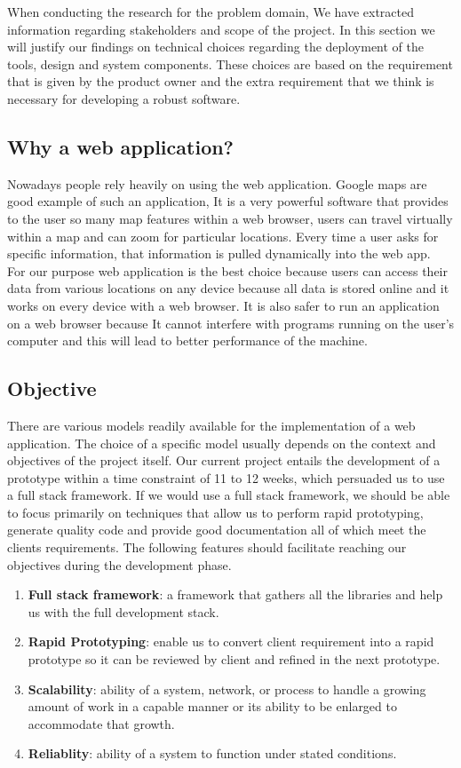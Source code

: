 When conducting the research for the problem domain, We have extracted information regarding stakeholders and scope of the project. In this section we will justify our findings on technical choices regarding the deployment of the tools, design and system components. These choices are based on the requirement that is given by the product owner and the extra requirement that we think is necessary for developing a robust software.

\subsection{Why a web application?}
Nowadays people rely heavily on using the web application. Google maps are good example of such an application, It is a very powerful software that provides to the user so many map features within a web browser, users can travel virtually within a map and can zoom for particular locations. Every time a user asks for specific information, that information is pulled dynamically into the web app.\\
 For our purpose web application is the best choice because users can access their data from various locations on any device because all data is stored online and it works on every device with a web browser. It is also safer to run an application on a web browser because It cannot interfere with programs running on the user's computer and this will lead to better performance of the machine.

\subsection{Objective}
There are various models readily available for the implementation of a web application. The choice of a specific model usually depends on the context and objectives of the project itself. Our current project entails the development of a prototype within a time constraint of 11 to 12 weeks, which persuaded us to use a full stack framework. If we would use a full stack framework, we should be able to focus primarily on techniques that allow us to perform rapid prototyping, generate quality code and provide good documentation all of which meet the clients requirements. The following features should facilitate reaching our objectives during the development phase.

\begin{enumerate}
	\item \textbf{Full stack framework}: a framework that gathers all the libraries and help us with the full development stack.
	\item \textbf{Rapid Prototyping}: enable us to convert client requirement into a rapid prototype so it can be reviewed by client and refined in the next prototype.
	\item \textbf{Scalability}: ability of a system, network, or process to handle a growing amount of work in a capable manner or its ability to be enlarged to accommodate that growth.\cite{wiki:scalability}
	\item \textbf{Reliablity}: ability of a system to function under stated conditions.
\end{enumerate}
